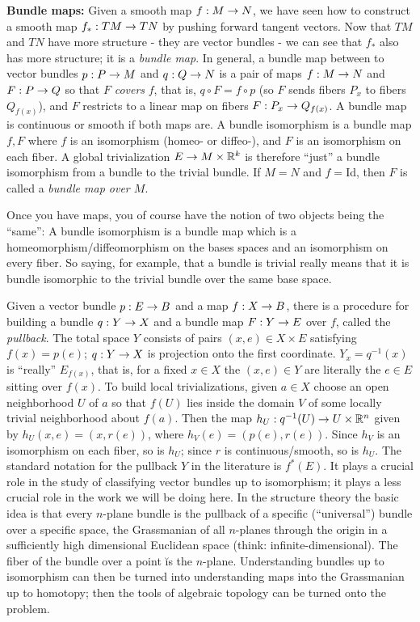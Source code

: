 \msk

{\bf Bundle maps:} Given a smooth map $f:M\rightarrow N$, we have seen how to construct a smooth
map $f_*:TM\rightarrow TN$ by pushing forward tangent vectors. Now that $TM$ and $TN$ have
more structure - they are vector bundles - we can see that $f_*$ also has more
structure; it is a {\it bundle map}. In general, a bundle map between to vector bundles
$p:P\rightarrow M$ and $q:Q\rightarrow N$ is a pair of maps $f:M\rightarrow N$ and $F:P\rightarrow Q$ so that 
$F$ {\it covers} $f$, that is, $q\circ F = f\circ p$ (so $F$ sends
fibers $P_x$ to fibers $Q_{f(x)}$), and $F$ restricts to a linear
map on fibers $F:P_x\rightarrow Q_{f(x)}$. A bundle map is continuous or smooth if both maps are.
A bundle isomorphism is a bundle map $f,F$ where $f$ is an isomorphism (homeo- or diffeo-),
and $F$ is an isomorphism on each fiber. A global trivialization $E\rightarrow M\times {\Bbb R}^k$
is therefore ``just'' a bundle isomorphism from a bundle to the trivial bundle.
If $M=N$ and $f=$Id, then $F$ is called a {\it bundle map over $M$}.

Once you have maps, you of course have the notion of two objects being the ``same'':
A bundle isomorphism is a bundle map which is a homeomorphism/diffeomorphism
on the bases spaces and an isomorphism on every fiber. So saying, for example, that
a bundle is trivial really means that it is bundle isomorphic to the trivial 
bundle over the same base space. 

Given a vector bundle $p:E\rightarrow B$ and a map $f:X\rightarrow B$, there is a procedure for building a 
bundle $q:Y\rightarrow X$ and a bundle map $F:Y\rightarrow E$ over $f$, called the {\it pullback}.
The total space $Y$ consists of pairs $(x,e)\in X\times E$ satisfying $f(x)=p(e)$;
$q:Y\rightarrow X$ is projection onto the first coordinate. $Y_x=q^{-1}(x)$ is ``really''
$E_{f(x)}$, that is, for a fixed $x\in X$ the $(x,e)\in Y$ are literally the $e\in E$
sitting over $f(x)$. To build local trivializations, 
given $a\in X$ choose an open neighborhood $U$ of $a$ so that $f(U)$ lies inside
the domain $V$ of some locally trivial neighborhood about $f(a)$. Then the 
map $h_U:q^{-1}(U)\rightarrow U\times {\Bbb R}^n$ given by $h_U(x,e)=(x,r(e))$, where
$h_V(e)=(p(e),r(e))$. Since $h_V$ is an isomorphism on each fiber, so is 
$h_U$; since $r$ is continuous/smooth, so is $h_U$. The standard notation for the 
pullback $Y$ in the literature is $f^*(E)$. It plays a crucial role in the study
of classifying vector bundles up to isomorphism; it plays a less crucial role in 
the work we will be doing here. In the structure theory the basic idea is that every 
$n$-plane bundle is the pullback of a specific (``universal'') bundle over a specific space,
the Grassmanian of all $n$-planes through the origin in a sufficiently high dimensional
Euclidean space (think: infinite-dimensional). The fiber of the bundle over a point
\u{is} the $n$-plane. Understanding bundles up to isomorphism can then be turned
into understanding maps into the Grassmanian up to homotopy; then the tools of 
algebraic topology can be turned onto the problem.

